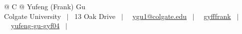 \documentclass[a4paper, 12pt]{article}
\begin{document}
\pagestyle{empty} 



\begin{tabularx}{\linewidth}{@{} C @{}}
\Huge{Yufeng (Frank) Gu} \\[7.5pt]
Colgate University \ $|$ \ 
13 Oak Drive \ $|$ \ 
\raisebox{-0.05\height}\faEnvelope \ \href{mailto:ygu1@colgate.edu}{ygu1@colgate.edu} \ $|$ \ 
\raisebox{-0.05\height}\faGithub\ \href{https://github.com/gyfffrank}{gyfffrank} \ $|$ \
\raisebox{-0.05\height}\faLinkedin\ \href{https://www.linkedin.com/in/yufeng-gu-gyf04}{yufeng-gu-gyf04} \ $|$ \
\end{tabularx}


%
\end{document}
